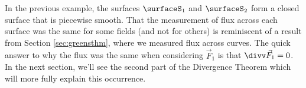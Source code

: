 In the previous example, the surfaces $\surfaceS_1$ and $\surfaceS_2$ form a closed surface that is piecewise smooth. That the measurement of flux across each surface was the same for some fields (and not for others) is reminiscent of a result from Section \ref{sec:greensthm}, where we measured flux across curves. The quick answer to why the flux was the same when considering $\vec F_1$ is that $\divv \vec F_1 = 0$. In the next section, we'll see the second part of the Divergence Theorem which will more fully explain this occurrence. 

